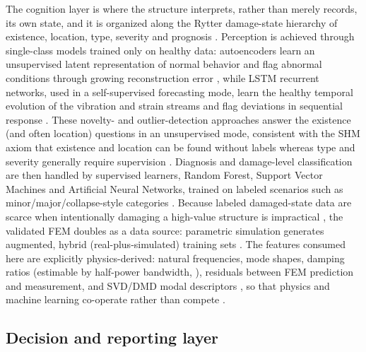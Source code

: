 The cognition layer is where the structure interprets, rather than merely records, its own state, and it is organized along the Rytter damage-state hierarchy of existence, location, type, severity and prognosis \citep{farrar2013shm}. Perception is achieved through single-class models trained only on healthy data: autoencoders learn an unsupervised latent representation of normal behavior and flag abnormal conditions through growing reconstruction error \citep{brunton2019data}, while LSTM recurrent networks, used in a self-supervised forecasting mode, learn the healthy temporal evolution of the vibration and strain streams and flag deviations in sequential response \citep{brunton2019data,naser2023ml}. These novelty- and outlier-detection approaches answer the existence (and often location) questions in an unsupervised mode, consistent with the SHM axiom that existence and location can be found without labels whereas type and severity generally require supervision \citep{farrar2013shm,sohn2003statistical,wangcha2022unsupervised}. Diagnosis and damage-level classification are then handled by supervised learners, Random Forest, Support Vector Machines and Artificial Neural Networks, trained on labeled scenarios such as minor/major/collapse-style categories \citep{naser2023ml,parisi2022steel}. Because labeled damaged-state data are scarce when intentionally damaging a high-value structure is impractical \citep{farrar2013shm}, the validated FEM doubles as a data source: parametric simulation generates augmented, hybrid (real-plus-simulated) training sets \citep{naser2023ml}. The features consumed here are explicitly physics-derived: natural frequencies, mode shapes, damping ratios (estimable by half-power bandwidth, \citealp{chopra2017dynamics}), residuals between FEM prediction and measurement, and SVD/DMD modal descriptors \citep{brunton2019data}, so that physics and machine learning co-operate rather than compete \citep{avci2021review}.

\subsection{Decision and reporting layer}\label{subsec:decision}

